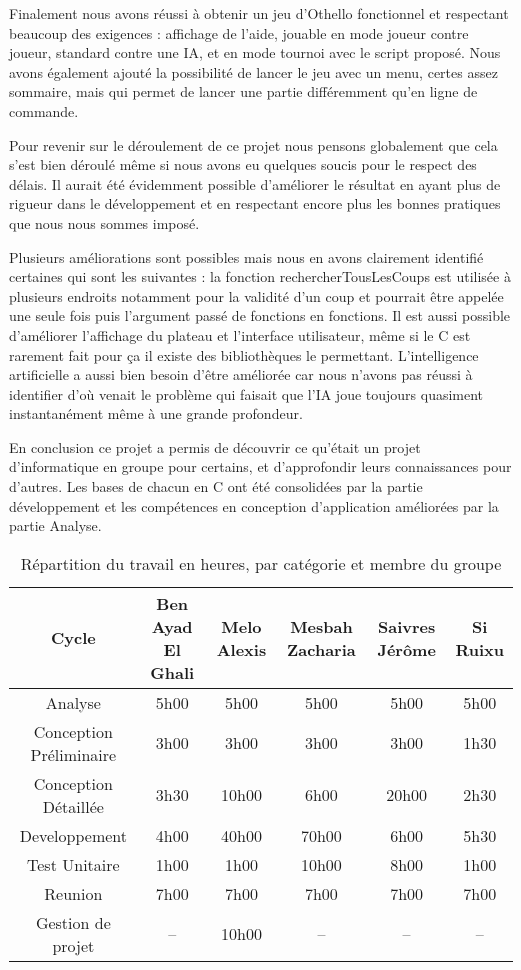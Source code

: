 Finalement nous avons réussi à obtenir un jeu d’Othello fonctionnel et respectant beaucoup des exigences : affichage de l’aide, jouable en mode joueur contre joueur, standard contre une IA, et en mode tournoi avec le script proposé. Nous avons également ajouté la possibilité de lancer le jeu avec un menu, certes assez sommaire, mais qui permet de lancer une partie différemment qu’en ligne de commande.

Pour revenir sur le déroulement de ce projet nous pensons globalement que cela s’est bien déroulé même si nous avons eu quelques soucis pour le respect des délais. Il aurait été évidemment possible d’améliorer le résultat en ayant plus de rigueur dans le développement et en respectant encore plus les bonnes pratiques que nous nous sommes imposé.

Plusieurs améliorations sont possibles mais nous en avons clairement identifié certaines qui sont les suivantes : la fonction rechercherTousLesCoups est utilisée à plusieurs endroits notamment pour la validité d’un coup et pourrait être appelée une seule fois puis l’argument passé de fonctions en fonctions. Il est aussi possible d’améliorer l’affichage du plateau et l’interface utilisateur, même si le C est rarement fait pour ça il existe des bibliothèques le permettant. L’intelligence artificielle a aussi bien besoin d’être améliorée car nous n’avons pas réussi à identifier d’où venait le problème qui faisait que l’IA joue toujours quasiment instantanément même à une grande profondeur.



En conclusion ce projet a permis de découvrir ce qu’était un projet d’informatique en groupe pour certains, et d’approfondir leurs connaissances pour d’autres. Les bases de chacun en C ont été consolidées par la partie développement et les compétences en conception d’application améliorées par la partie Analyse.

\begin{table}
\caption{R\'epartition du travail en heures, par catégorie et membre du groupe}\par\medskip
\begin{tabular}{|*{6}{c|}}
    \hline
   	Cycle  & Ben Ayad El Ghali  & Melo Alexis  & Mesbah Zacharia  & Saivres Jérôme  & Si Ruixu \\
    \hline
    Analyse  & 5h00  & 5h00  & 5h00  &  5h00  & 5h00  \\
    \hline
   	Conception Préliminaire & 3h00  & 3h00  & 3h00  & 3h00 & 1h30 \\
    \hline
   	Conception Détaillée & 3h30  & 10h00  & 6h00  & 20h00  & 2h30 \\
    \hline
   	 Developpement & 4h00  & 40h00  &  70h00 & 6h00  & 5h30 \\
    \hline
   	 Test Unitaire  &1h00  & 1h00  & 10h00  & 8h00 & 1h00 \\
    \hline
   	 Reunion  & 7h00  & 7h00  & 7h00  & 7h00 & 7h00 \\
    \hline
   	 Gestion de projet & -- & 10h00  & --  & -- & -- \\
    \hline
\end{tabular}
\end{table}